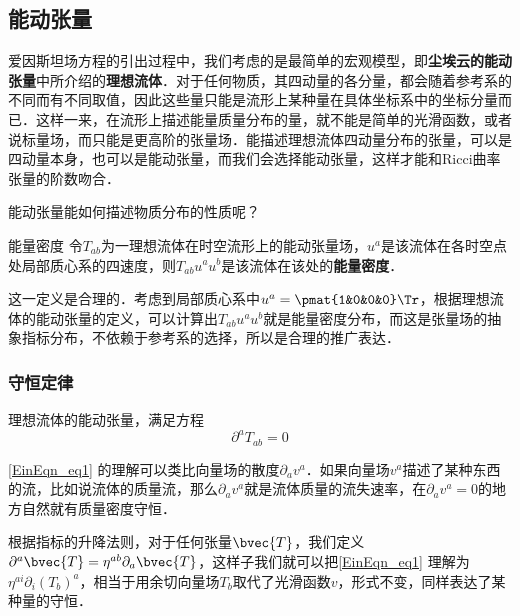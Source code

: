 

\subsection{能动张量}

爱因斯坦场方程的引出过程中，我们考虑的是最简单的宏观模型，即\textbf{尘埃云的能动张量}中所介绍的\textbf{理想流体}．对于任何物质，其四动量的各分量，都会随着参考系的不同而有不同取值，因此这些量只能是流形上某种量在具体坐标系中的坐标分量而已．这样一来，在流形上描述能量质量分布的量，就不能是简单的光滑函数，或者说标量场，而只能是更高阶的张量场．能描述理想流体四动量分布的张量，可以是四动量本身，也可以是能动张量，而我们会选择能动张量，这样才能和Ricci曲率张量的阶数吻合．

能动张量能如何描述物质分布的性质呢？

\begin{definition}{能量密度}
令$T_{ab}$为一理想流体在时空流形上的能动张量场，$u^a$是该流体在各时空点处局部质心系的四速度，则$T_{ab}u^au^b$是该流体在该处的\textbf{能量密度}．
\end{definition}

这一定义是合理的．考虑到局部质心系中$u^a=\pmat{1&0&0&0}\Tr$，根据理想流体的能动张量的定义，可以计算出$T_{ab}u^au^b$就是能量密度分布，而这是张量场的抽象指标分布，不依赖于参考系的选择，所以是合理的推广表达．

\subsubsection{守恒定律}

理想流体的能动张量，满足方程
\begin{equation}\label{EinEqn_eq1}
\partial^aT_{ab}=0
\end{equation}

\autoref{EinEqn_eq1} 的理解可以类比向量场的散度$\partial_av^a$．如果向量场$v^a$描述了某种东西的流，比如说流体的质量流，那么$\partial_av^a$就是流体质量的流失速率，在$\partial_av^a=0$的地方自然就有质量密度守恒．

根据指标的升降法则，对于任何张量$\bvec{T}$，我们定义$\partial^a\bvec{T}=\eta^{ab}\partial_a\bvec{T}$，这样子我们就可以把\autoref{EinEqn_eq1} 理解为$\eta^{ai}\partial_i(T_b)^a$，相当于用余切向量场$T_b$取代了光滑函数$v$，形式不变，同样表达了某种量的守恒．

